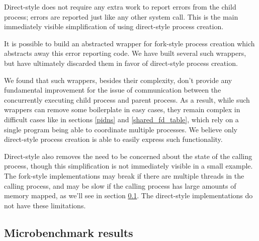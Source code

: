 \documentclass[letterpaper,twocolumn,10pt]{article}
\begin{document}
Direct-style does not require any extra work to report errors from the child process;
errors are reported just like any other system call.
This is the main immediately visible simplification of using direct-style process creation.

It is possible to build an abstracted wrapper for fork-style process creation
which abstracts away this error reporting code.
We have built several such wrappers\cite{sfork},
but have ultimately discarded them in favor of direct-style process creation.

We found that such wrappers, besides their complexity,
don't provide any fundamental improvement
for the issue of communication between the concurrently executing child process and parent process.
As a result, while such wrappers can remove some boilerplate in easy cases,
they remain complex in difficult cases like in sections \ref{pidns} and \ref{shared_fd_table},
which rely on a single program being able to coordinate multiple processes.
We believe only direct-style process creation is able to easily express such functionality.

Direct-style also removes the need to be concerned about the state of the calling process,
though this simplification is not immediately visible in a small example.
The fork-style implementations may break if there are multiple threads in the calling process,
and may be slow if the calling process has large amounts of memory mapped, as we'll see in section \ref{subprocess_bench}.
The direct-style implementations do not have these limitations.
\subsection{Microbenchmark results}\label{subprocess_bench}
\end{document}
